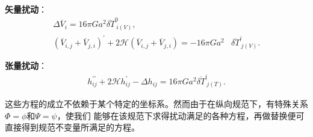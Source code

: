 \documentclass{article}
\begin{document}
  \textbf{矢量扰动}：
  \begin{align}
    \label{eq:equation-gauge-vector-perturbation}
    \Delta\overline{V}_{i}=16\pi Ga^2\overline{\delta T}^{0}_{\ i(V)}, \\  
    {\left(\overline{V}_{i,j}+\overline{V}_{j,i}\right)}^{\prime} + 
    2\mathcal{H}{\left(\overline{V}_{i,j}+\overline{V}_{j,i}\right)} = 
    -16\pi Ga^2&\overline{\delta T}^{i}_{\ j(V)}.
  \end{align}
  
  \textbf{张量扰动}：
  \begin{align}
    \label{eq:equation-gauge-tensor-perturbation}
    h^{\prime\prime}_{ij}+2\mathcal{H}h^\prime_{ij}-\Delta h_{ij}=16\pi
    Ga^2\overline{\delta T}^{i}_{\ j(T)}.
  \end{align}
  
  这些方程的成立不依赖于某个特定的坐标系。然而由于在纵向规范下，有特殊关系$\Phi=\phi$和$\Psi=\psi$，使我们
  能够在该规范下求得扰动满足的各种方程，再做替换便可直接得到规范不变量所满足的方程。
\end{document}
